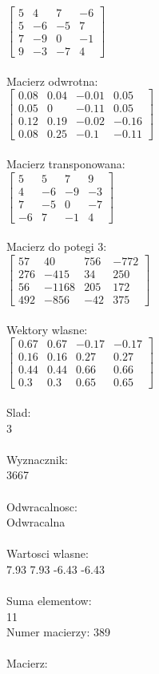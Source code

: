 \documentclass[a4paper,12pt]{article}
\begin{document}
$\begin{bmatrix} 5&4&7&-6\\5&-6&-5&7\\7&-9&0&-1\\9&-3&-7&4 \end{bmatrix}$
\\
\\
Macierz odwrotna:\\

$\begin{bmatrix} 0.08&0.04&-0.01&0.05\\0.05&0&-0.11&0.05\\0.12&0.19&-0.02&-0.16\\0.08&0.25&-0.1&-0.11 \end{bmatrix}$
\\
\\
Macierz transponowana:\\

$\begin{bmatrix} 5&5&7&9\\4&-6&-9&-3\\7&-5&0&-7\\-6&7&-1&4 \end{bmatrix}$
\\
\\
Macierz do potegi 3:\\

$\begin{bmatrix} 57&40&756&-772\\276&-415&34&250\\56&-1168&205&172\\492&-856&-42&375 \end{bmatrix}$
\\
\\
Wektory wlasne:\\

$\begin{bmatrix} 0.67&0.67&-0.17&-0.17\\0.16&0.16&0.27&0.27\\0.44&0.44&0.66&0.66\\0.3&0.3&0.65&0.65 \end{bmatrix}$
\\
\\
Slad:\\
3
\\
\\
Wyznacznik:\\
3667
\\
\\
Odwracalnosc:\\
Odwracalna
\\
\\
Wartosci wlasne:\\
7.93 7.93 -6.43 -6.43
\\
\\
Suma elementow:\\
11
\\
\newpage
Numer macierzy:
389
\\
\\
Macierz:\\
\end{document}
